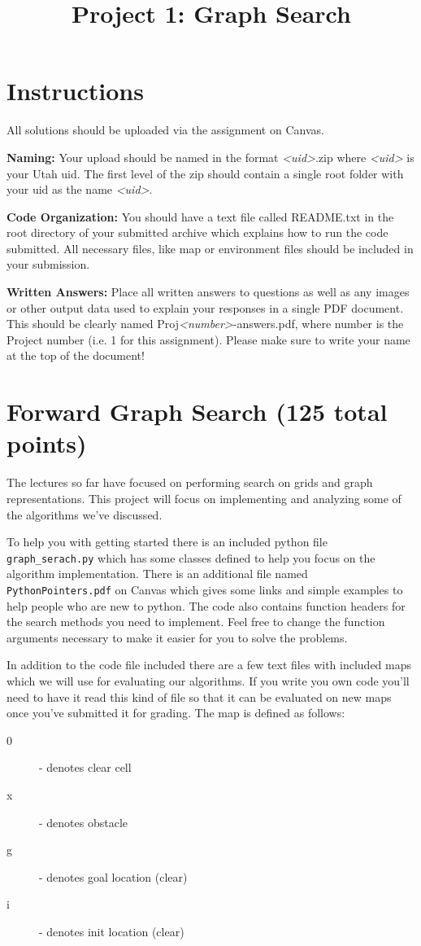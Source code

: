 \documentclass[11pt]{hermans-hw}
\institute{University of Utah}
\title{Project 1: Graph Search}
\begin{document}
\maketitle
\vspace{-30pt}
\section*{Instructions}
All solutions should be uploaded via the assignment on Canvas.

\textbf{Naming:} Your upload should be named in the format \emph{<uid>}.zip where \emph{<uid>} is your Utah uid. The first level of the zip should contain a single root folder with your uid as the name \emph{<uid>}.

\textbf{Code Organization:} You should have a text file called README.txt in the root directory of your submitted archive which explains how to run the code submitted. All necessary files, like map or environment files should be included in your submission.

\textbf{Written Answers:} Place all written answers  to questions as well as any images or other output data used to explain your responses in a single PDF document. This should be clearly named Proj\emph{<number>}-answers.pdf, where number is the Project number (i.e. 1 for this assignment). Please make sure to write your name at the top of the document!

\section*{Forward Graph Search (125 total points)}
The lectures so far have focused on performing search on grids and graph representations. This project will focus on implementing and analyzing some of the algorithms we've discussed.

To help you with getting started there is an included python file \texttt{graph\_serach.py} which has some classes defined to help you focus on the algorithm implementation. There is an additional file named \texttt{PythonPointers.pdf} on Canvas which gives some links and simple examples to help people who are new to python. The code also contains function headers for the search methods you need to implement. Feel free to change the function arguments necessary to make it easier for you to solve the problems.

In addition to the code file included there are a few text files with included maps which we will use for evaluating our algorithms. If you write you own code you'll need to have it read this kind of file so that it can be evaluated on new maps once you've submitted it for grading. The map is defined as follows:
\begin{description}
\item[0] - denotes clear cell
\item[x] - denotes obstacle
\item[g] - denotes goal location (clear)
\item[i] - denotes init location (clear)
\end{description}
\end{document}
